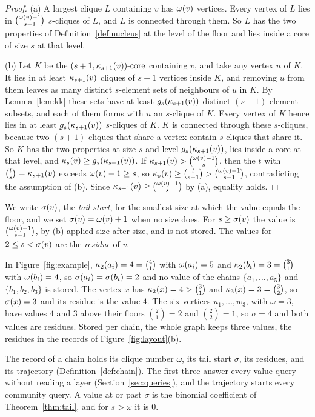\begin{proof}
(a) A largest clique $L$ containing $v$ has $\omega(v)$ vertices.
%
Every vertex of $L$ lies in $\binom{\omega(v)-1}{s-1}$ $s$-cliques of $L$, and $L$ is connected through them.
%
So $L$ has the two properties of Definition~\ref{def:nucleus} at the level of the floor and lies inside a core of size $s$ at that level.

(b) Let $K$ be the $(s+1,\kappa_{s+1}(v))\text{-core}$ containing $v$, and take any vertex $u$ of $K$.
%
It lies in at least $\kappa_{s+1}(v)$ cliques of $s+1$ vertices inside $K$, and removing $u$ from them leaves as many distinct $s$-element sets of neighbours of $u$ in $K$.
%
By Lemma~\ref{lem:kk} these sets have at least $g_s(\kappa_{s+1}(v))$ distinct $(s-1)$-element subsets, and each of them forms with $u$ an $s$-clique of $K$.
%
Every vertex of $K$ hence lies in at least $g_s(\kappa_{s+1}(v))$ $s$-cliques of $K$.
%
$K$ is connected through these $s$-cliques, because two $(s+1)$-cliques that share a vertex contain $s$-cliques that share it.
%
So $K$ has the two properties at size $s$ and level $g_s(\kappa_{s+1}(v))$, lies inside a core at that level, and $\kappa_{s}(v)\ge g_s(\kappa_{s+1}(v))$.
%
If $\kappa_{s+1}(v)>\binom{\omega(v)-1}{s}$, then the $t$ with $\binom{t}{s}=\kappa_{s+1}(v)$ exceeds $\omega(v)-1\ge s$, so $\kappa_{s}(v)\ge\binom{t}{s-1}>\binom{\omega(v)-1}{s-1}$, contradicting the assumption of (b).
%
Since $\kappa_{s+1}(v)\ge\binom{\omega(v)-1}{s}$ by (a), equality holds.
\end{proof}
We write $\sigma(v)$, the \textit{tail start}, for the smallest size at which the value equals the floor, and we set $\sigma(v)=\omega(v)+1$ when no size does.
%
For $s\ge\sigma(v)$ the value is $\binom{\omega(v)-1}{s-1}$, by (b) applied size after size, and is not stored.
%
The values for $2\le s<\sigma(v)$ are the \textit{residue} of $v$.
\begin{example}\label{ex:tail}
In Figure~\ref{fig:example}, $\kappa_{2}(a_i)=4=\binom{4}{1}$ with $\omega(a_i)=5$ and $\kappa_{2}(b_i)=3=\binom{3}{1}$ with $\omega(b_i)=4$, so $\sigma(a_i)=\sigma(b_i)=2$ and no value of the chains $\{a_1,\dots,a_5\}$ and $\{b_1,b_2,b_3\}$ is stored.
%
The vertex $x$ has $\kappa_{2}(x)=4>\binom{3}{1}$ and $\kappa_{3}(x)=3=\binom{3}{2}$, so $\sigma(x)=3$ and its residue is the value $4$.
%
The six vertices $u_1,\dots,w_3$, with $\omega=3$, have values $4$ and $3$ above their floors $\binom{2}{1}=2$ and $\binom{2}{2}=1$, so $\sigma=4$ and both values are residues.
%
Stored per chain, the whole graph keeps three values, the residues in the records of Figure~\ref{fig:layout}(b).
\end{example}
The record of a chain holds its clique number $\omega$, its tail start $\sigma$, its residues, and its trajectory (Definition~\ref{def:chain}).
%
The first three answer every value query without reading a layer (Section~\ref{sec:queries}), and the trajectory starts every community query.
%
A value at or past $\sigma$ is the binomial coefficient of Theorem~\ref{thm:tail}, and for $s>\omega$ it is $0$.

